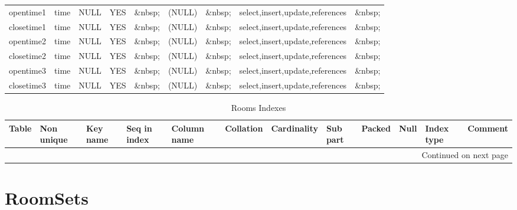 \documentclass[tablesignature,landscape]{scrartcl}
\begin{document}
\begin{longtable}{|l|l|l|l|l|l|l|l|l|}
 opentime1         &  time          &  NULL                     &  YES      &  \&nbsp;  &  (NULL)   &  \&nbsp;            &  select,insert,update,references  &  \&nbsp;  \\
 closetime1        &  time          &  NULL                     &  YES      &  \&nbsp;  &  (NULL)   &  \&nbsp;            &  select,insert,update,references  &  \&nbsp;  \\
 opentime2         &  time          &  NULL                     &  YES      &  \&nbsp;  &  (NULL)   &  \&nbsp;            &  select,insert,update,references  &  \&nbsp;  \\
 closetime2        &  time          &  NULL                     &  YES      &  \&nbsp;  &  (NULL)   &  \&nbsp;            &  select,insert,update,references  &  \&nbsp;  \\
 opentime3         &  time          &  NULL                     &  YES      &  \&nbsp;  &  (NULL)   &  \&nbsp;            &  select,insert,update,references  &  \&nbsp;  \\
 closetime3        &  time          &  NULL                     &  YES      &  \&nbsp;  &  (NULL)   &  \&nbsp;            &  select,insert,update,references  &  \&nbsp;  \\
\hline
\end{longtable}


\begin{longtable}{|l|l|l|l|l|l|l|l|l|l|l|l|}
\caption{Rooms Indexes} \label{tbl:roomsindexes}\\
\hline
 Table  &  Non unique  &  Key name  &  Seq in index  &  Column name  &  Collation  &  Cardinality  &  Sub part  &  Packed  &  Null     &  Index type  &  Comment \\
\hline
\endhead
\hline\multicolumn{12}{r}{Continued on next page}\
\endfoot
\endlastfoot
\hline
 Rooms  &           0  &  PRIMARY   &             1  &  roomid       &  A          &           38  &  (NULL)    &  (NULL)  &  \&nbsp;  &  BTREE       &  \&nbsp;  \\
\hline
\end{longtable}
\section{RoomSets}
\label{sec-23}
\end{document}
